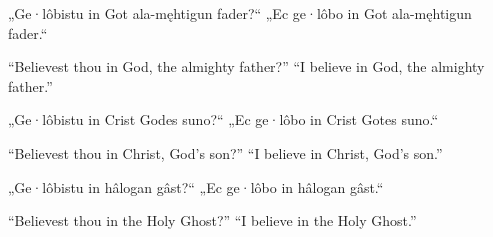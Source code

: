 \bpg\bpa[0][7]%
„Ge·lôbistu in Got ala-męhtigun fader?“ „Ec ge·lôbo in Got ala-męhtigun fader.“\epa

\bpb “Believest thou in God, the almighty father?” “I believe in God, the almighty father.”\epb\epg


\bpg\bpa[0][9]%
„Ge·lôbistu in Crist Godes suno?“ „Ec ge·lôbo in Crist Gotes suno.“\epa

\bpb “Believest thou in Christ, God’s son?” “I believe in Christ, God’s son.”\epb\epg


\bpg\bpa[0][11]%
„Ge·lôbistu in hâlogan gâst?“ „Ec ge·lôbo in hâlogan gâst.“\epa

\bpb “Believest thou in the Holy Ghost?” “I believe in the Holy Ghost.”\epb\epg

\sectionline
